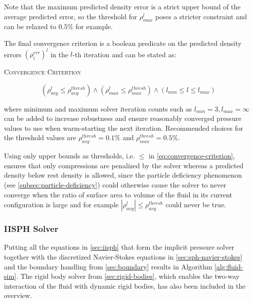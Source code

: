 \documentclass[oneside, a4paper]{book}
\newcommand{\equationnamed}[2]{%
  \setlength{\fboxsep}{2pt} %
  \setlength{\fboxrule}{0.01pt}
  \begin{center}
    \begin{minipage}{\textwidth}
      \begin{center}\textsc{#1}\end{center}
      #2
    \end{minipage}
  \end{center}
}
\newcommand\abs[1]{\left|#1\right|}
\newcommand\br[1]{\left(#1\right)}
\begin{document}
  Note that the maximum predicted density error is a strict upper bound of the average predicted error, so the threshold for $\rho^{l}_{max}$ poses a stricter constraint and can be relaxed to $0.5\%$ for example.

  The final convergence criterion is a boolean predicate on the predicted density errors $\br{\rho_i^{err}}^l$ in the $l$-th iteration and can be stated as:
  \equationnamed{Convergence Critertion}{\begin{equation}
    \br{\rho^l_{avg} \leq \rho^{thresh}_{avg}}
    \land \br{\rho^l_{max} \leq \rho^{thresh}_{max}}
    \land \br{l_{min} \leq l \leq l_{max}}
    \label{eq:convergence-criterion}
  \end{equation}}
  where minimum and maximum solver iteration counts such as $l_{min}=3, l_{max}=\infty$ can be added to increase robustness and ensure reasonably converged pressure values to use when warm-starting the next iteration. Recommended choices for the threshold values are $\rho^{thresh}_{avg}=0.1\%$ \autocite{iisph} and $\rho^{thresh}_{max}=0.5\%$.

  Using only upper bounds as thresholds, i.e. $\leq$ in \autoref{eq:convergence-criterion}, ensures that only compressions are penalized by the solver whereas a predicted density below rest density is allowed, since the particle deficiency phenomenon (see \autoref{subsec:particle-deficiency}) could otherwise cause the solver to never converge when the ratio of surface area to volume of the fluid in its current configuration is large and for example $\abs{\rho^l_{avg}} \leq \rho^{thresh}_{avg}$ could never be true. 


  \subsubsection{IISPH Solver}\label{subsec:iisph-solver}
  Putting all the equations in \autoref{sec:iisph} that form the implicit pressure solver together with the discretized Navier-Stokes equations in \autoref{sec:sph-navier-stokes} and the boundary handling from \autoref{sec:boundary} results in Algorithm \ref{alg:fluid-sim}. 
  The rigid body solver from \autoref{sec:rigid-bodies}, which enables the two-way interaction of the fluid with dynamic rigid bodies, has also been included in the overview.
\end{document}
